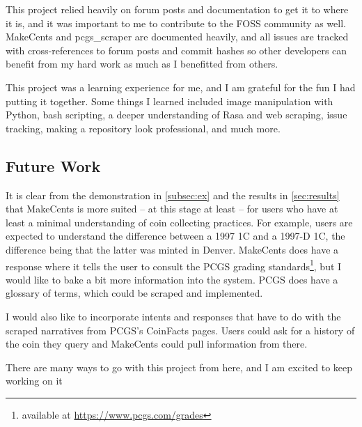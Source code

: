 \documentclass[11pt,a4paper]{article}
\begin{document}
This project relied heavily on forum posts and documentation to get it to where it is, and it was important to me to contribute to the FOSS community as well. MakeCents and pcgs\_scraper are documented heavily, and all issues are tracked with cross-references to forum posts and commit hashes so other developers can benefit from my hard work as much as I benefitted from others.

This project was a learning experience for me, and I am grateful for the fun I had putting it together. Some things I learned included image manipulation with Python, bash scripting, a deeper understanding of Rasa and web scraping, issue tracking, making a repository look professional, and much more. 

\subsection{Future Work}
It is clear from the demonstration in \cref{subsec:ex} and the results in \cref{sec:results} that MakeCents is more suited -- at this stage at least -- for users who have at least a minimal understanding of coin collecting practices. For example, users are expected to understand the difference between a 1997 1C and a 1997-D 1C, the difference being that the latter was minted in Denver. MakeCents does have a response where it tells the user to consult the PCGS grading standards\footnote{available at \href{https://www.pcgs.com/grades}{https://www.pcgs.com/grades}}, but I would like to bake a bit more information into the system. PCGS does have a glossary of terms, which could be scraped and implemented.

I would also like to incorporate intents and responses that have to do with the scraped narratives from PCGS's CoinFacts pages. Users could ask for a history of the coin they query and MakeCents could pull information from there. 

There are many ways to go with this project from here, and I am excited to keep working on it





\end{document}
